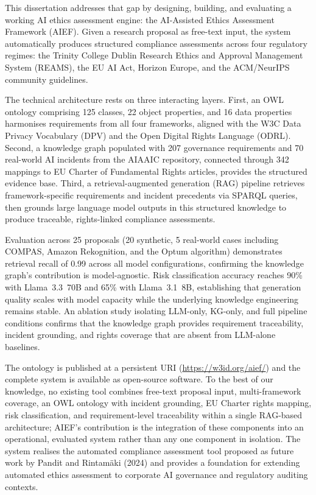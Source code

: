 \documentclass[a4paper,oneside,12pt]{book}
\numberwithin{equation}{chapter}
\begin{document}
This dissertation addresses that gap by designing, building, and evaluating a working AI ethics assessment engine: the AI-Assisted Ethics Assessment Framework (AIEF). Given a research proposal as free-text input, the system automatically produces structured compliance assessments across four regulatory regimes: the Trinity College Dublin Research Ethics and Approval Management System (REAMS), the EU AI Act, Horizon Europe, and the ACM/NeurIPS community guidelines.

The technical architecture rests on three interacting layers. First, an OWL ontology comprising 125 classes, 22 object properties, and 16 data properties harmonises requirements from all four frameworks, aligned with the W3C Data Privacy Vocabulary (DPV) and the Open Digital Rights Language (ODRL). Second, a knowledge graph populated with 207 governance requirements and 70 real-world AI incidents from the AIAAIC repository, connected through 342 mappings to EU Charter of Fundamental Rights articles, provides the structured evidence base. Third, a retrieval-augmented generation (RAG) pipeline retrieves framework-specific requirements and incident precedents via SPARQL queries, then grounds large language model outputs in this structured knowledge to produce traceable, rights-linked compliance assessments.

Evaluation across 25 proposals (20 synthetic, 5 real-world cases including COMPAS, Amazon Rekognition, and the Optum algorithm) demonstrates retrieval recall of 0.99 across all model configurations, confirming the knowledge graph's contribution is model-agnostic. Risk classification accuracy reaches 90\% with Llama~3.3~70B and 65\% with Llama~3.1~8B, establishing that generation quality scales with model capacity while the underlying knowledge engineering remains stable. An ablation study isolating LLM-only, KG-only, and full pipeline conditions confirms that the knowledge graph provides requirement traceability, incident grounding, and rights coverage that are absent from LLM-alone baselines.

The ontology is published at a persistent URI (\url{https://w3id.org/aief/}) and the complete system is available as open-source software. To the best of our knowledge, no existing tool combines free-text proposal input, multi-framework coverage, an OWL ontology with incident grounding, EU Charter rights mapping, risk classification, and requirement-level traceability within a single RAG-based architecture; AIEF's contribution is the integration of these components into an operational, evaluated system rather than any one component in isolation. The system realises the automated compliance assessment tool proposed as future work by Pandit and Rintam\"{a}ki (2024) and provides a foundation for extending automated ethics assessment to corporate AI governance and regulatory auditing contexts.
\end{document}
